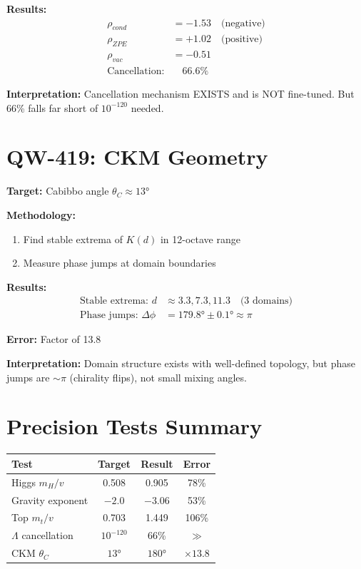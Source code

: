 \documentclass[11pt, a4paper]{article}
\theoremstyle{remark}
\begin{document}
\textbf{Results:}
\begin{align}
\rho_{cond} &= -1.53 \quad \text{(negative)} \\
\rho_{ZPE} &= +1.02 \quad \text{(positive)} \\
\rho_{vac} &= -0.51 \\
\text{Cancellation:} &\quad \mathbf{66.6\%}
\end{align}

\textbf{Interpretation:} Cancellation mechanism EXISTS and is NOT fine-tuned. But 66\% falls far short of $10^{-120}$ needed.

\section{QW-419: CKM Geometry}

\textbf{Target:} Cabibbo angle $\theta_C \approx 13°$

\textbf{Methodology:}
\begin{enumerate}
    \item Find stable extrema of $K(d)$ in 12-octave range
    \item Measure phase jumps at domain boundaries
\end{enumerate}

\textbf{Results:}
\begin{align}
\text{Stable extrema: } d &\approx 3.3, 7.3, 11.3 \quad \text{(3 domains)} \\
\text{Phase jumps: } \Delta\phi &= 179.8° \pm 0.1° \approx \pi
\end{align}

\textbf{Error:} Factor of 13.8

\textbf{Interpretation:} Domain structure exists with well-defined topology, but phase jumps are $\sim\pi$ (chirality flips), not small mixing angles.

\section{Precision Tests Summary}

\begin{center}
\begin{tabular}{|l|c|c|c|}
\hline
\textbf{Test} & \textbf{Target} & \textbf{Result} & \textbf{Error} \\
\hline
Higgs $m_H/v$ & 0.508 & 0.905 & 78\% \\
Gravity exponent & $-2.0$ & $-3.06$ & 53\% \\
Top $m_t/v$ & 0.703 & 1.449 & 106\% \\
$\Lambda$ cancellation & $10^{-120}$ & 66\% & $\gg$ \\
CKM $\theta_C$ & $13°$ & $180°$ & $\times 13.8$ \\
\hline
\end{tabular}
\end{center}
\end{document}
